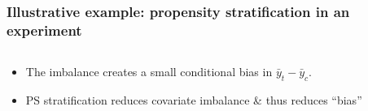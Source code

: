 \begin{frame}
  \frametitle{Illustrative example: propensity stratification in an experiment}

\begin{columns}
  \begin{column}{.5\linewidth}
    \begin{itemize}
    \item The imbalance creates a small conditional bias in $\bar{y}_{t} - \bar{y}_{c}$.
    \item<2-> PS stratification reduces covariate imbalance \citep{hill:etal:2000} \& thus reduces ``bias''
   \end{itemize}
  \end{column}
  \begin{column}{.5\linewidth}
  \end{column}
\end{columns}
\end{frame}



